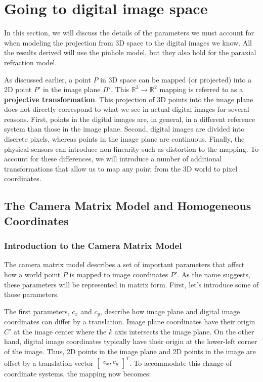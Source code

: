 \documentclass[a4paper, 12pt]{article}
\renewcommand\emph{\textbf}
\begin{document}
\section{Going to digital image space}
In this section, we will discuss the details of the parameters we must account for when modeling the projection from 3D space to the digital images we know. All the results derived will use the pinhole model, but they also hold for the paraxial refraction model.

As discussed earlier, a point $P$ in 3D space can be mapped (or projected) into a 2D point $P'$ in the image plane $\Pi'$. This $\mathbb{R}^3 \rightarrow \mathbb{R}^2$ mapping is referred to as a \emph{projective transformation}. This projection of 3D points into the image plane does not directly correspond to what we see in actual digital images for several reasons. First, points in the digital images are, in general, in a different reference system than those in the image plane. Second, digital images are divided into discrete pixels, whereas points in the image plane are continuous. Finally, the physical sensors can introduce non-linearity such as distortion to the mapping. To account for these differences, we will introduce a number of additional transformations that allow us to map any point from the 3D world to pixel coordinates.

\subsection{The Camera Matrix Model and Homogeneous Coordinates}

\subsubsection{Introduction to the Camera Matrix Model}
The camera matrix model describes a set of important parameters that affect how a world point $P$ is mapped to image coordinates $P'$. As the name suggests, these parameters will be represented in matrix form. First, let's introduce some of those parameters.

The first parameters, $c_x$ and $c_y$, describe how image plane and digital image coordinates can differ by a translation. Image plane coordinates have their origin $C'$ at the image center where the $k$ axis intersects the image plane. On the other hand, digital image coordinates typically have their origin at the lower-left corner of the image. Thus, 2D points in the image plane and 2D points in the image are offset by a translation vector $\begin{bmatrix}c_x, c_y\end{bmatrix}^T$. To accommodate this change of coordinate systems, the mapping now becomes:
\end{document}
